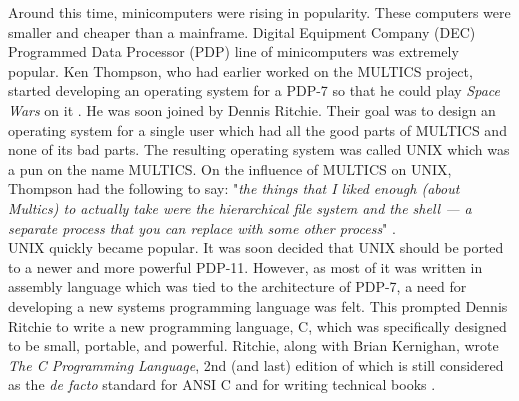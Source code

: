 Around this time, minicomputers were rising in popularity. These computers were smaller and cheaper than a mainframe. Digital Equipment Company (DEC) Programmed Data Processor (PDP) line of minicomputers was extremely popular. Ken Thompson, who had earlier worked on the MULTICS project, started developing an operating system for a PDP-7 so that he could play \textit{Space Wars} on it \cite{torvalds2001just}. He was soon joined by Dennis Ritchie. Their goal was to design an operating system for a single user which had all the good parts of MULTICS and none of its bad parts. The resulting operating system was called UNIX which was a pun on the name MULTICS. On the influence of MULTICS on UNIX, Thompson had the following to say: "\textit{the things that I liked enough (about Multics) to actually take were the hierarchical file system and the shell — a separate process that you can replace with some other process}" \cite{seibel2009coders}.\\
UNIX quickly became popular. It was soon decided that UNIX should be ported to a newer and more powerful PDP-11. However, as most of it was written in assembly language which was tied to the architecture of PDP-7, a need for developing a new systems programming language was felt. This prompted Dennis Ritchie to write a new programming language, C, which was specifically designed to be small, portable, and powerful. Ritchie, along with Brian Kernighan, wrote \textit{The C Programming Language}, 2nd (and last) edition of which is still considered as the \textit{de facto} standard for ANSI C and for writing technical books \cite{ritchie1988c}.

